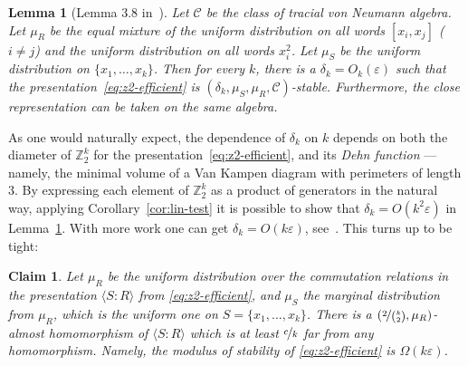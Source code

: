 \documentclass[11pt]{article}
\newtheorem{lemma}[theorem]{Lemma}
\newtheorem{claim}[theorem]{Claim}
\theoremstyle{definition}
\newcommand{\Z}{\ensuremath{\mathbb{Z}}}
\newcommand{\mC}{\ensuremath{\mathcal{C}}}
\newcommand{\eps}{\varepsilon}
\begin{document}
\begin{lemma}[Lemma 3.8 in~\cite{slofstra2019set}]\label{lem:eff-z2}
Let $\mC$ be the class of tracial von Neumann algebra. Let $\mu_R$ be the equal mixture of the uniform distribution on all words $[x_i,x_j]$ ($i\neq j$) and the uniform distribution on all words $x_i^2$. Let $\mu_S$ be the uniform distribution on $\{x_1,\ldots,x_k\}$. Then 
  for every $k$, there is a $\delta_k = O_k(\eps)$ such that the presentation~\eqref{eq:z2-efficient} is $(\delta_k,\mu_S,\mu_R,\mC)$-stable. Furthermore, the close representation can be taken on the same algebra.%
\end{lemma}

As one would naturally expect, the dependence of $\delta_k$ on $k$ depends on both the diameter of $\Z_2^k$ for the presentation~\eqref{eq:z2-efficient}, and its \emph{Dehn function} --- namely, the minimal volume of a Van Kampen diagram with perimeters of length $3$. By expressing each element of $\Z_2^k$ as a product of generators in the natural way, applying Corollary~\ref{cor:lin-test} it is possible to show that $\delta_k=O(k^2\eps)$ in Lemma~\ref{lem:eff-z2}. With more work one can get $\delta_k=O(k\eps)$, see~\cite[Theorem 3.2]{chao2017overlapping}. This turns up to be  tight:
\begin{claim}
    Let $\mu_R$ be the uniform distribution over the commutation relations in the presentation $\langle S\colon R\rangle$ from \eqref{eq:z2-efficient}, and $\mu_S$ the marginal distribution from $\mu_R$, which is the uniform one on $S=\{x_1,...,x_k\}$. There is a $(\nicefrac{2}{\binom{k}{2}},\mu_R)$-almost homomorphism of $\langle S\colon R\rangle$ which is at least $\nicefrac{c}{k}$ far from any homomorphism. Namely, the modulus of stability of \eqref{eq:z2-efficient} is $\Omega(k\eps)$.
\end{claim}
\end{document}
